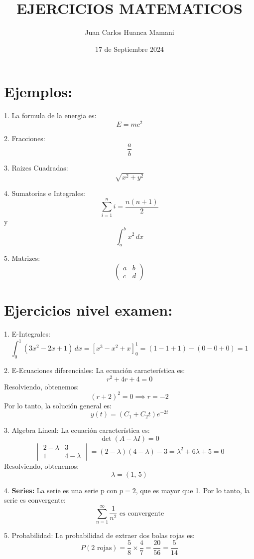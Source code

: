 \documentclass[12pt,Letterpaper]{article}
\title { \textbf{EJERCICIOS MATEMATICOS}}
\author {Juan Carlos Huanca Mamani}
\date {17 de Septiembre 2024}
\begin{document}
\maketitle
\section{Ejemplos:}


1. La formula de la energia es: \[E = mc^2\]

 
2. Fracciones: \[ \frac{a}{b}\]


3. Raizes Cuadradas: \[ \sqrt{x^2+y^2}\]


4. Sumatorias e Integrales: \[ \sum_{i=1}^{n} i = \frac{n(n+1)}{2} \] y                                           \[ \int_{a}^{b} x^2 \, dx \]


5. Matrizes: \[\begin{pmatrix}a & b \\ c & d\end{pmatrix}\]


\section{Ejercicios nivel examen:}


1. E-Integrales:
\[\int_{0}^{1} (3x^2 - 2x + 1) \, dx = \left[ x^3 - x^2 + x \right]_{0}^{1} = (1 - 1 + 1) - (0 - 0 + 0) = 1\]


2. E-Ecuaciones diferenciales:
La ecuación característica es: \[r^2 + 4r + 4 = 0\]
Resolviendo, obtenemos:\[(r + 2)^2 = 0 \implies r = -2\]
Por lo tanto, la solución general es:\[y(t) = (C_1 + C_2 t)e^{-2t}\]


3. Algebra Lineal:
La ecuación característica es:\[\det(A - \lambda I) = 0\]\[\begin{vmatrix}2 -\lambda& 3 \\1 & 4 - \lambda\end{vmatrix} = (2 - \lambda)(4 - \lambda) - 3 = \lambda^2+6\lambda + 5 = 0\]
Resolviendo, obtenemos:\[\lambda = (1, \, 5)\]


4. \textbf{Series:}
La serie es una serie p con \( p = 2 \), que es mayor que 1. Por lo tanto, la serie es convergente:
\[\sum_{n=1}^{\infty} \frac{1}{n^2} \text{ es convergente}\]


5. Probabilidad:
La probabilidad de extraer dos bolas rojas es:
\[P(\text{2 rojas}) = \frac{5}{8} \times \frac{4}{7} = \frac{20}{56} = \frac{5}{14}\]
\end{document}
